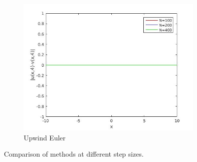 \begin{figure}[H]
\begin{subfigure}[b]{0.3\textwidth}
  \includegraphics[width=\textwidth]{Images/5_ue_compare.jpg}
  \caption{Upwind Euler}
\end{subfigure}
\caption{Comparison of methods at different step sizes.}
\label{fig:ncompare}
\end{figure}


